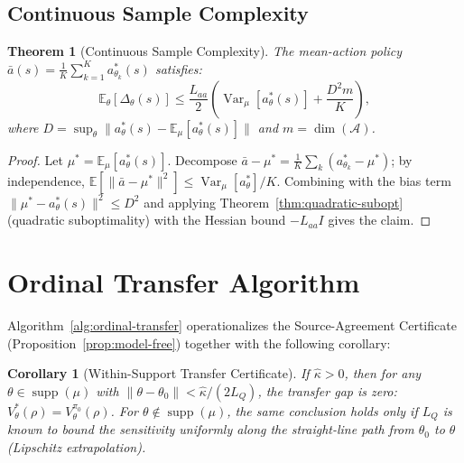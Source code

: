 \documentclass{article}
\newtheorem{theorem}{Theorem}
\newtheorem{corollary}{Corollary}
\newcommand{\E}{\mathbb{E}}
\newcommand{\cA}{\mathcal{A}}
\DeclareMathOperator{\Var}{Var}
\begin{document}
\subsection{Continuous Sample Complexity}

\begin{theorem}[Continuous Sample Complexity]
\label{thm:continuous-sample}
The mean-action policy $\bar{a}(s) = \frac{1}{K}\sum_{k=1}^K a^*_{\theta_k}(s)$ satisfies:
\[
\E_{\theta}[\Delta_{\theta}(s)] \leq \frac{L_{aa}}{2}\left(\Var_\mu[a^*_\theta(s)] + \frac{D^2 m}{K}\right),
\]
where $D = \sup_\theta \|a^*_\theta(s) - \E_\mu[a^*_\theta(s)]\|$ and $m = \dim(\cA)$.
\end{theorem}
\begin{proof}
Let $\mu^* = \E_\mu[a^*_\theta(s)]$. Decompose $\bar{a} - \mu^* = \frac{1}{K}\sum_k (a^*_{\theta_k} - \mu^*)$; by independence, $\E[\|\bar{a}-\mu^*\|^2] \leq \Var_\mu[a^*_\theta]/K$. Combining with the bias term $\|\mu^* - a^*_\theta(s)\|^2 \leq D^2$ and applying Theorem~\ref{thm:quadratic-subopt} (quadratic suboptimality) with the Hessian bound $-L_{aa}I$ gives the claim.
\end{proof}

\section{Ordinal Transfer Algorithm}
\label{app:algorithm}

Algorithm~\ref{alg:ordinal-transfer} operationalizes the Source-Agreement Certificate (Proposition~\ref{prop:model-free}) together with the following corollary:

\begin{corollary}[Within-Support Transfer Certificate]
\label{cor:model-free-transfer}
If $\hat{\kappa} > 0$, then for any $\theta \in \operatorname{supp}(\mu)$ with $\|\theta - \theta_0\| < \hat{\kappa}/(2L_Q)$, the transfer gap is zero: $V^*_{\theta}(\rho) = V^{\pi_0}_{\theta}(\rho)$. For $\theta \notin \operatorname{supp}(\mu)$, the same conclusion holds only if $L_Q$ is known to bound the sensitivity uniformly along the straight-line path from $\theta_0$ to $\theta$ (Lipschitz extrapolation).
\end{corollary}
\end{document}
